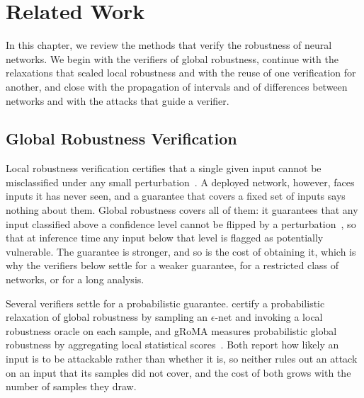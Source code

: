 %
%
%
\chapter{Related Work}
\label{ch:related-work}

In this chapter, we review the methods that verify the robustness of
neural networks. We begin with the verifiers of global robustness,
continue with the relaxations that scaled local robustness and
with the reuse of one verification for another, and close with the
propagation of intervals and of differences between networks and with
the attacks that guide a verifier. 

\section{Global Robustness Verification}
\label{sec:related-global-robustness}

Local robustness verification certifies that a single given input
cannot be misclassified under any small
perturbation~\citep{katz2017reluplex,gehr2018,singh2019,wang2021}. A
deployed network, however, faces inputs it has never seen, and a
guarantee that covers a fixed set of inputs says nothing about them.
Global robustness covers all of them: it guarantees that any input
classified above a confidence level cannot be flipped by a
perturbation~\citep{leino2021gloro,kabaha2024vhagar,athavale2024}, so
that at inference time any input below that level is flagged as
potentially vulnerable. The guarantee is stronger, and so is the cost
of obtaining it, which is why the verifiers below settle for a weaker
guarantee, for a restricted class of networks, or for a long analysis.

Several verifiers settle for a probabilistic guarantee.
\citet{blohm2025} certify a probabilistic relaxation of global
robustness by sampling an $\epsilon$-net and invoking a local
robustness oracle on each sample, and gRoMA measures probabilistic
global robustness by aggregating local statistical
scores~\citep{levy2023}. Both report how likely an input is to be
attackable rather than whether it is, so neither rules out an attack
on an input that its samples did not cover, and the cost of both grows
with the number of samples they draw.


